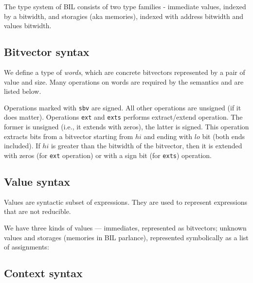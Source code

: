 \documentclass[11pt]{article}
\begin{document}
\ottgrammartabular{
\ottvar\ottinterrule
}

\ottgrammartabular{
\ottbop\ottinterrule
\ottaop\ottinterrule
\ottlop\ottinterrule
\ottuop\ottinterrule
\ottendian\ottinterrule
\ottcast\ottinterrule
}

The type system of BIL consists of two type families - immediate
values, indexed by a bitwidth, and storagies (aka memories), indexed
with address bitwidth and values bitwidth.

\ottgrammartabular{
\otttype\ottinterrule
}

\subsection{Bitvector syntax}
\label{sec:bitvector}

We define a type of {\em words}, which are concrete bitvectors
represented by a pair of value and size.  Many operations on words are
required by the semantics and are listed below.

Operations marked with \verb|sbv| are signed. All other operations are
unsigned (if it does matter).  Operations \verb|ext| and \verb|exts|
performs extract/extend operation. The former is unsigned (i.e., it
extends with zeros), the latter is signed. This operation extracts
bits from a bitvector starting from $\mathit{hi}$ and ending with
$\mathit{lo}$ bit (both ends included). If $\mathit{hi}$ is greater
than the bitwidth of the bitvector, then it is extended with zeros
(for \verb|ext| operation) or with a sign bit (for \verb|exts|)
operation.

\ottgrammartabular{
\ottword\ottinterrule
}

\subsection{Value syntax}
\label{sec:values}

Values are syntactic subset of expressions. They are used to represent
expressions that are not reducible.

We have three kinds of values --- immediates, represented as
bitvectors; unknown values and storages (memories in BIL parlance),
represented symbolically as a list of assignments:

\ottgrammartabular{
\ottval\ottinterrule
}

\subsection{Context syntax}
\label{sec:context}
\end{document}
